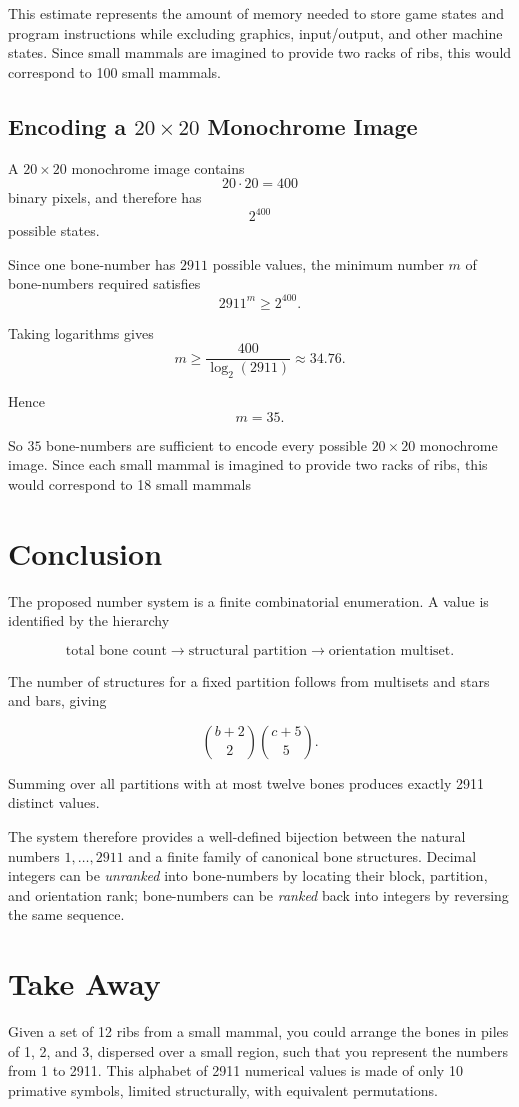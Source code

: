 \documentclass[11pt]{article}
\theoremstyle{remark}
\begin{document}
This estimate represents the amount of memory needed to store game states and program instructions while excluding graphics, input/output, and other machine states. Since small mammals are imagined to provide two racks of ribs, this would correspond to 100 small mammals.

\subsection{Encoding a \(20\times20\) Monochrome Image}

A \(20\times20\) monochrome image contains
\[
20\cdot20=400
\]
binary pixels, and therefore has
\[
2^{400}
\]
possible states.

\bigskip
Since one bone-number has \(2911\) possible values, the minimum number \(m\) of
bone-numbers required satisfies
\[
2911^m\geq2^{400}.
\]

Taking logarithms gives
\[
m\geq\frac{400}{\log_2(2911)}
\approx34.76.
\]

Hence
\[
\boxed{m=35}.
\]

So \(35\) bone-numbers are sufficient to encode every possible \(20\times20\) monochrome image. Since each small mammal is imagined to provide two racks of ribs, this would correspond to 18 small mammals

\newpage
\section{Conclusion}

The proposed number system is a finite combinatorial enumeration. A value is
identified by the hierarchy

\[
\boxed{
\text{total bone count}
\longrightarrow
\text{structural partition}
\longrightarrow
\text{orientation multiset}.
}
\]

\bigskip
The number of structures for a fixed partition follows from multisets and stars
and bars, giving

\[
\binom{b+2}{2}\binom{c+5}{5}.
\]

\bigskip
Summing over all partitions with at most twelve bones produces exactly 2911 distinct values.

\bigskip
The system therefore provides a well-defined bijection between the natural numbers \(1,\ldots,2911\) and a finite family of canonical bone structures. Decimal integers can be \emph{unranked} into bone-numbers by locating their block, partition, and orientation rank; bone-numbers can be \emph{ranked} back into integers by reversing the same sequence.

\section{Take Away}

Given a set of 12 ribs from a small mammal, you could arrange the bones in piles of 1, 2, and 3, dispersed over a small region, such that you represent the numbers from 1 to 2911. This alphabet of 2911 numerical values is made of only 10 primative symbols, limited structurally, with equivalent permutations.
\end{document}
